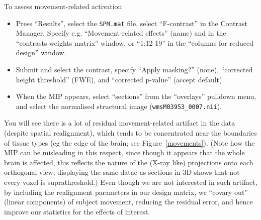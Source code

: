 To assess movement-related activation
\begin{itemize}
\item Press ``Results'', select the \texttt{SPM.mat} file, select ``F-contrast'' in the Contrast Manager. Specify e.g. ``Movement-related effects'' (name) and 
in the ``contrasts weights matrix'' window, or ``1:12 19'' in the ``columns for reduced design'' window.
\item Submit and select the contrast, specify ``Apply masking?'' (none), ``corrected height threshold'' (FWE), and ``corrected p-value'' (accept default). 
\item When the MIP appears, select ``sections'' from the ``overlays'' pulldown menu, and select the normalised structural image (\texttt{wmsM03953\_0007.nii}).
\end{itemize}

You will see there is a lot of residual movement-related artifact in the data (despite spatial realignment), which tends to be concentrated near the boundaries of tissue types (eg the edge of the brain; see Figure~\ref{movements}). (Note how the MIP can be misleading in this respect, since though it appears that the whole brain is affected, this reflects the nature of the (X-ray like) projections onto each orthogonal view; displaying the same datae as sections in 3D shows that not every voxel is suprathreshold.)  Even though we are not interested in such artifact, by including the realignment parameters in our design matrix, we ``covary out'' (linear components) of subject movement, reducing the residual error, and hence improve our statistics for the effects of interest.

